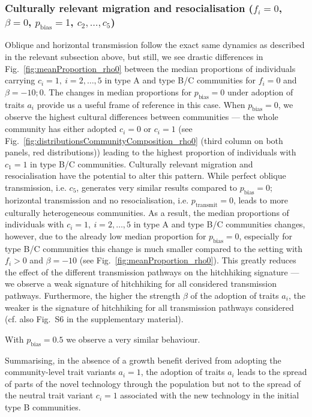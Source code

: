 \documentclass[9pt,twocolumn,twoside,lineno]{pnas-new}
\begin{document}
\subsubsection*{Culturally relevant migration and resocialisation ($f_i=0$, $\beta=0$, $p_\text{bias}=1$, $c_2,\ldots,c_5$)}

Oblique and horizontal transmission follow the exact same dynamics as described in the relevant subsection above, but still, we see drastic differences in Fig.~\ref{fig:meanProportion_rho0} between the median proportions of individuals carrying $c_i=1,\ i=2,\ldots,5$ in type A and type B/C communities for $f_i=0$ and $\beta=-10;0$.   
The changes in median proportions for $p_\text{bias}=0$ under adoption of traits $a_i$ provide us a useful frame of reference in this case.
When $p_\text{bias}=0$, we observe the highest cultural differences between communities --- the whole community has either adopted $c_i=0$ or $c_i=1$ (see Fig.~\ref{fig:distributionsCommunityComposition_rho0} (third column on both panels, red distributions)) leading to the highest proportion of individuals with $c_1=1$ in type B/C communities. Culturally relevant migration and resocialisation have the potential to alter this pattern.
%
While perfect oblique transmission, i.e. $c_5$, generates very similar results compared to $p_\text{bias}=0$; horizontal transmission and no resocialisation, i.e. $p_\text{transmit}=0$, leads to more culturally heterogeneous communities. As a result, the median proportions of individuals with  $c_i=1,\ i=2,\ldots,5$ in type A and type B/C communities changes, however, due to the already low median proportion for $p_\text{bias}=0$, especially for type B/C communities this change is much smaller compared to the setting with $f_i>0$ and $\beta=-10$ (see Fig.~\ref{fig:meanProportion_rho0}). 
%
This greatly reduces the effect of the different transmission pathways on the hitchhiking signature --- we observe a weak signature of hitchhiking for all considered transmission pathways. Furthermore, the higher the strength $\beta$ of the adoption of traits $a_i$, the weaker is the signature of hitchhiking for all transmission pathways considered (cf. also Fig.~S6 in the supplementary material). 

With $p_\text{bias}=0.5$ we observe a very similar behaviour.

Summarising, in the absence of a growth benefit derived from adopting the community-level trait variants $a_i=1$, the adoption of traits $a_i$ leads to the spread of parts of the novel technology through the population but not to the spread of the neutral trait variant $c_i=1$ associated with the new technology in the initial type B communities. 
\end{document}
